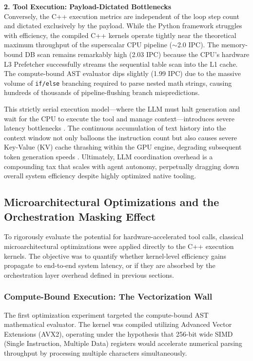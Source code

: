 \documentclass[10pt, letterpaper]{article}
\begin{document}
\textbf{2. Tool Execution: Payload-Dictated Bottlenecks} \\
Conversely, the C++ execution metrics are independent of the loop step count and dictated exclusively by the payload. While the Python framework struggles with efficiency, the compiled C++ kernels operate tightly near the theoretical maximum throughput of the superscalar CPU pipeline ($\sim$2.0 IPC). The memory-bound DB scan remains remarkably high (2.03 IPC) because the CPU's hardware L3 Prefetcher successfully streams the sequential table scan into the L1 cache. The compute-bound AST evaluator dips slightly (1.99 IPC) due to the massive volume of \texttt{if/else} branching required to parse nested math strings, causing hundreds of thousands of pipeline-flushing branch mispredictions. 

This strictly serial execution model---where the LLM must halt generation and wait for the CPU to execute the tool and manage context---introduces severe latency bottlenecks \cite{paste}. The continuous accumulation of text history into the context window not only balloons the instruction count but also causes severe Key-Value (KV) cache thrashing within the GPU engine, degrading subsequent token generation speeds \cite{data_systems, sutradhara}. Ultimately, LLM coordination overhead is a compounding tax that scales with agent autonomy, perpetually dragging down overall system efficiency despite highly optimized native tooling.

\subsection{Microarchitectural Optimizations and the Orchestration Masking Effect}
To rigorously evaluate the potential for hardware-accelerated tool calls, classical microarchitectural optimizations were applied directly to the C++ execution kernels. The objective was to quantify whether kernel-level efficiency gains propagate to end-to-end system latency, or if they are absorbed by the orchestration layer overhead defined in previous sections.

\subsubsection{Compute-Bound Execution: The Vectorization Wall}
The first optimization experiment targeted the compute-bound AST mathematical evaluator. The kernel was compiled utilizing Advanced Vector Extensions (AVX2), operating under the hypothesis that 256-bit wide SIMD (Single Instruction, Multiple Data) registers would accelerate numerical parsing throughput by processing multiple characters simultaneously. 
\end{document}

